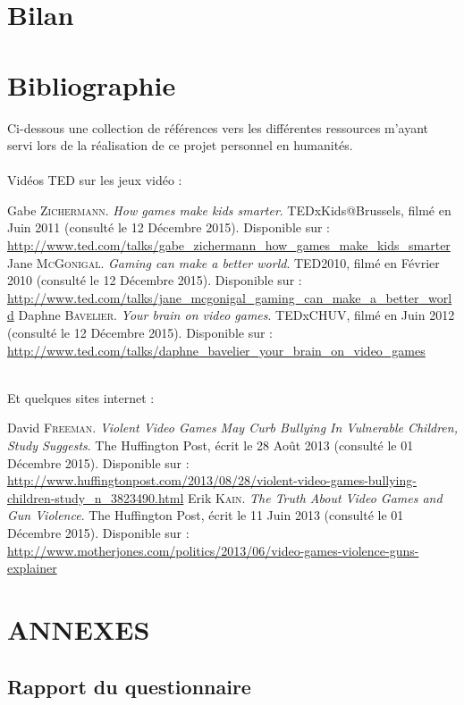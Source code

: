 \documentclass[10pt,a4paper]{article}
\begin{document}
\section{Bilan}
\newpage
\section{Bibliographie}

Ci-dessous une collection de références vers les différentes ressources m'ayant servi lors de la réalisation de ce projet personnel en humanités.\\\\

Vidéos TED sur les jeux vidéo :

\begin{thebibliography}{0}
     Gabe \textsc{Zichermann}. \emph{How games make kids smarter}. TEDxKids@Brussels, filmé en Juin 2011 (consulté le 12 Décembre 2015). Disponible sur :\\ \url{http://www.ted.com/talks/gabe_zichermann_how_games_make_kids_smarter}
      Jane \textsc{McGonigal}. \emph{Gaming can make a better world}. TED2010, filmé en Février 2010 (consulté le 12 Décembre 2015). Disponible sur :\\ \url{http://www.ted.com/talks/jane_mcgonigal_gaming_can_make_a_better_world}
      Daphne \textsc{Bavelier}. \emph{Your brain on video games}. TEDxCHUV, filmé en Juin 2012 (consulté le 12 Décembre 2015). Disponible sur :\\ \url{http://www.ted.com/talks/daphne_bavelier_your_brain_on_video_games}\\\\
\end{thebibliography}

Et quelques sites internet :

\begin{thebibliography}{0}
     David \textsc{Freeman}. \emph{Violent Video Games May Curb Bullying In Vulnerable Children, Study Suggests}. The Huffington Post, écrit le 28 Août 2013 (consulté le 01 Décembre 2015). Disponible sur :\\ \url{http://www.huffingtonpost.com/2013/08/28/violent-video-games-bullying-children-study_n_3823490.html}
       Erik \textsc{Kain}. \emph{The Truth About Video Games and Gun Violence}. The Huffington Post, écrit le 11 Juin 2013 (consulté le 01 Décembre 2015). Disponible sur :\\ \url{http://www.motherjones.com/politics/2013/06/video-games-violence-guns-explainer}
\end{thebibliography}

\newpage

\section{ANNEXES}

\subsection{Rapport du questionnaire}
\end{document}
